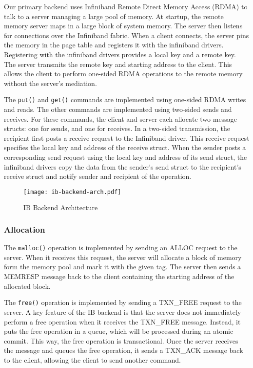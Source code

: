 Our primary backend uses Infiniband Remote Direct Memory Access (RDMA) to talk
to a server managing a large pool of memory. At startup, the remote memory
server maps in a large block of system memory. The server then listens for
connections over the Infiniband fabric. When a client connects, the server
pins the memory in the page table and registers it with the infiniband drivers.
Registering with the infiniband drivers provides a local key and a remote key.
The server transmits the remote key and starting address to the client.
This allows the client to perform one-sided RDMA operations to the remote
memory without the server's mediation.

The \texttt{put()} and \texttt{get()} commands are implemented using one-sided
RDMA writes and reads. The other commands are implemented using two-sided sends
and receives. For these commands, the client and server each allocate two
message structs: one for sends, and one for receives. In a two-sided
transmission, the recipient first posts a receive request to the Infiniband
driver. This receive request specifies the local key and address of the receive
struct. When the sender posts a corresponding send request using the local key
and address of its send struct, the infiniband drivers copy the data from the
sender's send struct to the recipient's receive struct and notify sender and
recipient of the operation.

\begin{figure}
    \texttt{[image: ib-backend-arch.pdf]}
    \caption{IB Backend Architecture}
    \label{fig:ib-backend-arch}
\end{figure}

\subsubsection{Allocation}

The \texttt{malloc()} operation is implemented by sending an ALLOC request to
the server. When it receives this request, the server will allocate a block of
memory form the memory pool and mark it with the given tag.  The server then
sends a MEMRESP message back to the client containing the starting address of
the allocated block.

The \texttt{free()} operation is implemented by sending a TXN\_FREE request to
the server. A key feature of the IB backend is that the server does not
immediately perform a free operation when it receives the TXN\_FREE message.
Instead, it puts the free operation in a queue, which will be processed during
an atomic commit. This way, the free operation is transactional. Once the
server receives the message and queues the free operation, it sends a TXN\_ACK
message back to the client, allowing the client to send another command.

